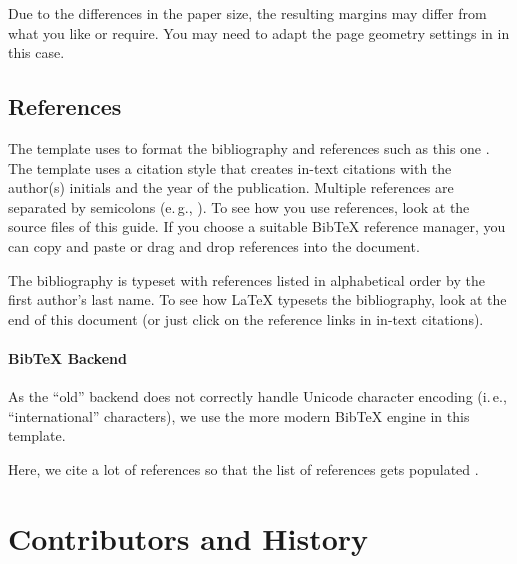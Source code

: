 Due to the differences in the paper size, the resulting margins may differ from what you like or require. You may need to adapt the page geometry settings in  in this case.

\subsection{References}

The template uses  to format the bibliography and references such as this one \cite{murdoch_steven_j._chip_2010}. The template uses a citation style that creates in-text citations with the author(s) initials and the year of the publication. Multiple references are separated by semicolons (e.\,g., \cite{solat_security_2017, bond_chip_2014}). To see how you use references, look at the source files of this guide. If you choose a suitable BibTeX reference manager, you can copy and paste or drag and drop references into the document.

The bibliography is typeset with references listed in alphabetical order by the first author's last name. To see how LaTeX typesets the bibliography, look at the end of this document (or just click on the reference links in in-text citations).

\paragraph{BibTeX Backend}

As the ``old''  backend does not correctly handle Unicode character encoding (i.\,e., ``international'' characters), we use the more modern  BibTeX engine in this template.

Here, we cite a lot of references so that the list of references gets populated \cite{murdoch_steven_j._chip_2010,anderson_ross_emv:_2014,kou_weidong_secure_2003,solat_security_2017,bond_chip_2014,ortiz_s._is_2006,haselsteiner_security_2006,galloway_visa_2019,zhou_nshield_2014,lalehTaxonomyFraudsFraud2009,ferradiWhenOrganizedCrime2016,Yang10,Kopsell06,VilaGM03,Herrmann12-ipv6prefix,Herrmann14-diss,HBF:2013,Herrmann11-NordSec,AcarEEJND14,Herrmann09,WangG13,Raymond00,Hintz02,Herrmann14-encdns,Goodson12-privacy,WendolskyHF07,chaum81,BertholdFK00,Dingledine04,rfc5246,LoesingMD10,FuchsHF13}.



\section{Contributors and History}

